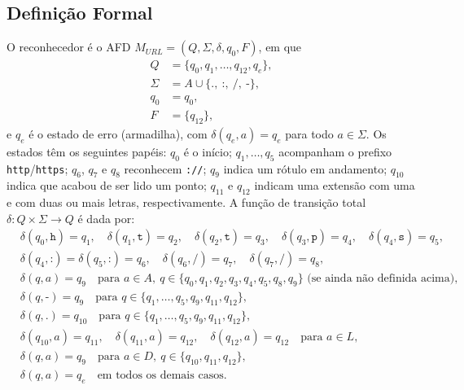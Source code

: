 \documentclass[12pt]{article}
\begin{document}
\subsection{Definição Formal}
O reconhecedor é o AFD $M_{URL} = (Q, \Sigma, \delta, q_0, F)$, em que
\begin{align*}
  Q      &= \{q_0, q_1, \dots, q_{12}, q_e\}, \\
  \Sigma &= A \cup \{\texttt{.},\ \texttt{:},\ \texttt{/},\ \texttt{-}\}, \\
  q_0    &= q_0, \\
  F      &= \{q_{12}\},
\end{align*}
e $q_e$ é o estado de erro (armadilha), com $\delta(q_e, a) = q_e$ para todo
$a \in \Sigma$. Os estados têm os seguintes papéis: $q_0$ é o início;
$q_1,\dots,q_5$ acompanham o prefixo \texttt{http}/\texttt{https}; $q_6$, $q_7$
e $q_8$ reconhecem \texttt{://}; $q_9$ indica um rótulo em andamento; $q_{10}$
indica que acabou de ser lido um ponto; $q_{11}$ e $q_{12}$ indicam uma extensão
com uma e com duas ou mais letras, respectivamente. A função de transição total
$\delta : Q \times \Sigma \to Q$ é dada por:
\begin{align*}
  & \delta(q_0, \texttt{h}) = q_1, \quad
    \delta(q_1, \texttt{t}) = q_2, \quad
    \delta(q_2, \texttt{t}) = q_3, \quad
    \delta(q_3, \texttt{p}) = q_4, \quad
    \delta(q_4, \texttt{s}) = q_5, \\
  & \delta(q_4, \texttt{:}) = \delta(q_5, \texttt{:}) = q_6, \quad
    \delta(q_6, \texttt{/}) = q_7, \quad
    \delta(q_7, \texttt{/}) = q_8, \\
  & \delta(q, a) = q_9 \quad \text{para } a \in A,\
    q \in \{q_0, q_1, q_2, q_3, q_4, q_5, q_8, q_9\}
    \text{ (se ainda não definida acima)}, \\
  & \delta(q, \texttt{-}) = q_9 \quad \text{para }
    q \in \{q_1, \dots, q_5, q_9, q_{11}, q_{12}\}, \\
  & \delta(q, \texttt{.}) = q_{10} \quad \text{para }
    q \in \{q_1, \dots, q_5, q_9, q_{11}, q_{12}\}, \\
  & \delta(q_{10}, a) = q_{11}, \quad
    \delta(q_{11}, a) = q_{12}, \quad
    \delta(q_{12}, a) = q_{12} \quad \text{para } a \in L, \\
  & \delta(q, a) = q_9 \quad \text{para } a \in D,\
    q \in \{q_{10}, q_{11}, q_{12}\}, \\
  & \delta(q, a) = q_e \quad \text{em todos os demais casos.}
\end{align*}
\end{document}
